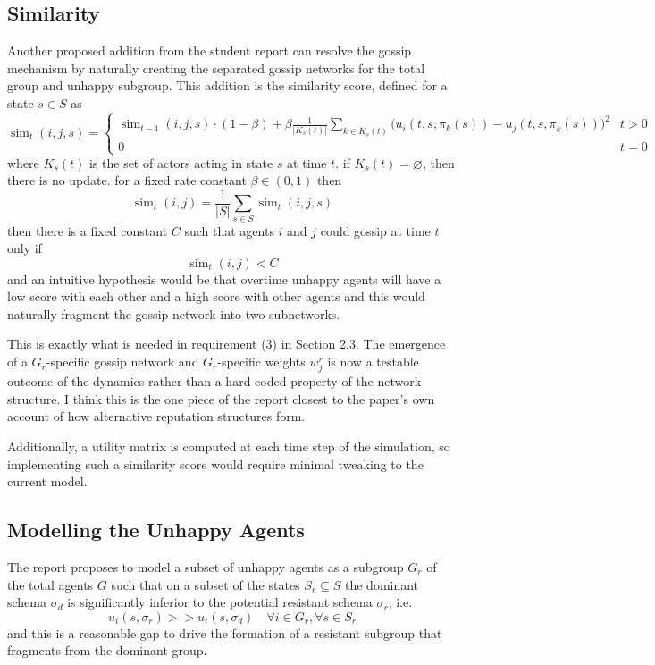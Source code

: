 \documentclass[12pt]{article}
\begin{document}
\subsection{Similarity}
Another proposed addition from the student report can resolve the gossip mechanism
by naturally creating the separated gossip networks for the total group and unhappy subgroup.
This addition is the similarity score, defined for a state $s \in S$ as
\[ \operatorname{sim}_t(i, j, s) = \begin{cases}
    \operatorname{sim}_{t - 1}(i, j, s) \cdot (1 - \beta) + \beta \frac{1}{|K_s(t)|}\sum_{k \in K_s(t)}\Big(u_i(t, s, \pi_k(s)) - u_j(t, s, \pi_k(s))\Big)^2 & t > 0 \\
    0 & t = 0
\end{cases}
\]
where $K_s(t)$ is the set of actors acting in state $s$ at time $t$. if $K_s(t) = \varnothing$, 
then there is no update.
for a fixed rate constant $\beta \in (0, 1)$
then
\[ \operatorname{sim}_t(i, j) = \frac{1}{|S|}\sum_{s \in S}\operatorname{sim}_t(i, j, s) \]
then there is a fixed constant $C$ such that agents $i$ and $j$ could gossip at time $t$
only if
\[ \operatorname{sim}_t(i, j) < C \]
and an intuitive hypothesis would be that overtime unhappy agents will have a low score with each other
and a high score with other agents and this would naturally fragment the gossip network
into two subnetworks.

This is exactly what is needed in requirement (3) in Section 2.3. The emergence of a $G_r$-specific gossip network
and $G_r$-specific weights $w^r_j$ is now a testable outcome of the dynamics rather than
a hard-coded property of the network structure. I think this is the one piece of the report closest to the paper's
own account of how alternative reputation structures form.

Additionally, a utility matrix is computed at each time step of the simulation, so implementing
such a similarity score would require minimal tweaking to the current model.

\subsection{Modelling the Unhappy Agents}
The report proposes to model a subset of unhappy agents as a subgroup $G_r$ of the total agents $G$
such that on a subset of the states $S_r \subseteq S$ the dominant schema $\sigma_d$
is significantly inferior to the potential resistant schema $\sigma_r$, i.e.
\[ u_i(s, \sigma_r) >> u_i(s, \sigma_d) \quad \forall i \in G_r, \forall s \in S_r \]
and this is a reasonable gap to drive the formation of a resistant subgroup that fragments from the dominant group.
\end{document}
